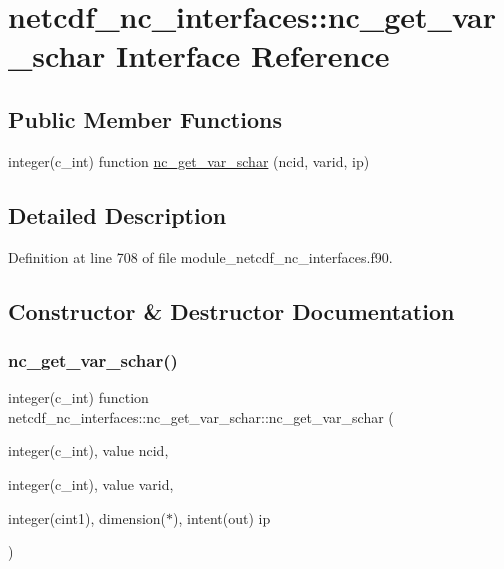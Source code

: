 \hypertarget{interfacenetcdf__nc__interfaces_1_1nc__get__var__schar}{}\section{netcdf\+\_\+nc\+\_\+interfaces\+:\+:nc\+\_\+get\+\_\+var\+\_\+schar Interface Reference}
\label{interfacenetcdf__nc__interfaces_1_1nc__get__var__schar}
\subsection*{Public Member Functions}
\begin{DoxyCompactItemize}
\item 
integer(c\+\_\+int) function \hyperlink{interfacenetcdf__nc__interfaces_1_1nc__get__var__schar_a8350ab895de5d04ade8f43a39a59d524}{nc\+\_\+get\+\_\+var\+\_\+schar} (ncid, varid, ip)
\end{DoxyCompactItemize}


\subsection{Detailed Description}


Definition at line 708 of file module\+\_\+netcdf\+\_\+nc\+\_\+interfaces.\+f90.



\subsection{Constructor \& Destructor Documentation}
\mbox{\label{interfacenetcdf__nc__interfaces_1_1nc__get__var__schar_a8350ab895de5d04ade8f43a39a59d524}} 
\subsubsection{\texorpdfstring{nc\+\_\+get\+\_\+var\+\_\+schar()}{nc\_get\_var\_schar()}}
{\footnotesize\ttfamily integer(c\+\_\+int) function netcdf\+\_\+nc\+\_\+interfaces\+::nc\+\_\+get\+\_\+var\+\_\+schar\+::nc\+\_\+get\+\_\+var\+\_\+schar (\begin{DoxyParamCaption}\item[{integer(c\+\_\+int), value}]{ncid,  }\item[{integer(c\+\_\+int), value}]{varid,  }\item[{integer(cint1), dimension($\ast$), intent(out)}]{ip }\end{DoxyParamCaption})}



